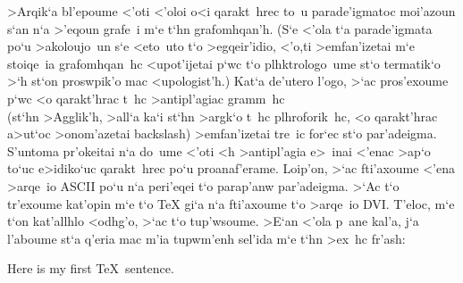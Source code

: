 >Arqik`a bl'epoume <'oti <'oloi o<i qarakt~hrec to~u parade'igmatoc  
moi'azoun s`an n`a >'eqoun grafe~i m`e t`hn gra\-fo\-mh\-qan'h.  (S`e
<'ola t`a parade'igmata po`u >akoloujo~un s`e <eto~uto t`o
>eg\-qei\-r'i\-dio, <'o,ti >emfan'izetai m`e stoiqe~ia
gra\-fo\-mh\-qa\-n~hc <upot'ijetai p`wc t`o plh\-ktro\-log\-o~ume st`o
termatik`o >`h st`on proswpik'o mac  <upologist'h.)  Kat`a de'utero
l'ogo, >`ac pros'exoume p`wc <o qarakt'hrac t~hc >antipl'agiac gramm~hc
{\tt \\} (st`hn >Agglik'h, >all`a ka`i st`hn >argk`o t~hc plhroforik~hc,
<o qarakt'hrac a>ut`oc >onom'azetai {\rm backslash}) >emfan'izetai
tre~ic for`ec st`o par'adeigma.  S'untoma pr'okeitai n`a do~ume <'oti <h
>antipl'agia e>~inai <'enac >ap`o to`uc e>idiko`uc qarakt~hrec po`u
pro\-ana\-f'erame.  Loip'on, >`ac fti'axoume <'ena >arqe~io {\rm ASCII}
po`u n`a peri'eqei t`o parap'anw par'adeigma. >`Ac t`o tr'exoume
kat'opin m`e t`o {\rm \TeX} gi`a n`a fti'axoume t`o >arqe~io {\rm
DVI}\null.  T'eloc, m`e t`on kat'allhlo <odhg'o, >`ac t`o tup'wsoume.
>E`an <'ola p~ane kal'a, j`a l'aboume st`a q'eria mac m'ia tupwm'enh
sel'ida m`e t`hn >ex~hc fr'ash:

{\rm Here is my first \TeX\ sentence.}

